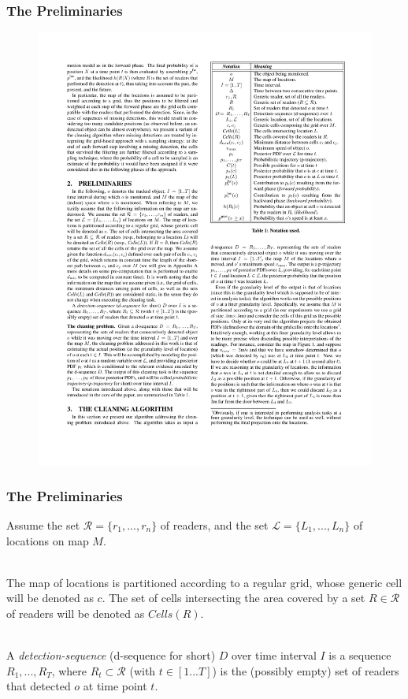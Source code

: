 
\begin{frame}
\frametitle{The Preliminaries}

\begin{figure}[tb]
  \includegraphics[width=0.55\columnwidth]{figures/3-4/3-4-15.pdf}
\end{figure}

\end{frame}


\begin{frame}
\frametitle{The Preliminaries}

Assume the set $\mathcal{R} = \{ r_1,...,r_n \}$ of readers, and the set $\mathcal{L} = \{ L_1,...,L_n \}$ of locations on map $M$.\\~\\ \pause

The map of locations is partitioned according to a regular grid, whose generic cell will be denoted as $c$. The set of cells intersecting the area covered by a set $R \in \mathcal{R}$ of readers will be denoted as $Cells(R)$. \\~\\ \pause

A \emph{detection-sequence} (d-sequence for short) $D$ over time interval $I$ is a sequence $R_1,...,R_T$, where $R_t \subset \mathcal{R}$ (with $t \in [1...T]$) is the (possibly empty) set of readers that detected $o$ at time point $t$.

\end{frame}


